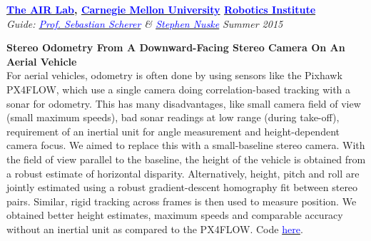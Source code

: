 \documentclass[margin,line]{res}
\newenvironment{list1}{
  \begin{list}{\ding{113}}{%
      \setlength{\itemsep}{0in}
      \setlength{\parsep}{0in} \setlength{\parskip}{0in}
      \setlength{\topsep}{0in} \setlength{\partopsep}{0in} 
      \setlength{\leftmargin}{0.17in}}}{\end{list}}
\begin{document}
\begin{resume}
{\bf  \href{http://theairlab.org/}{\textcolor{blue}{The AIR Lab}}, \href{http://www.cmu.edu/}{\textcolor{blue}{Carnegie Mellon University}} \href{http://ri.cmu.edu/}{\textcolor{blue}{Robotics Institute}}} \\
{\em Guide: \href{http://www.ri.cmu.edu/person.html?person_id=1397}{\textcolor{blue}{Prof. Sebastian Scherer}} \& \href{http://www.ri.cmu.edu/person.html?person_id=2128}{\textcolor{blue} {Stephen Nuske}}} \hfill {\it Summer 2015} \\
\vspace*{-.13in}
\begin{list1}
\item[]\textbf{Stereo Odometry From A Downward-Facing Stereo Camera On An Aerial Vehicle} \\
For aerial vehicles, odometry is often done by using sensors like the Pixhawk PX4FLOW, which use a single camera doing correlation-based tracking with a sonar for odometry. This has many disadvantages, like small camera field of view (small maximum speeds), bad sonar readings at low range (during take-off), requirement of an inertial unit for angle measurement and height-dependent camera focus. We aimed to replace this with a small-baseline stereo camera. With the field of view parallel to the baseline, the height of the vehicle is obtained from a robust estimate of horizontal disparity. Alternatively, height, pitch and roll are jointly estimated using a robust gradient-descent homography fit between stereo pairs. Similar, rigid tracking across frames is then used to measure position. We obtained better height estimates, maximum speeds and comparable accuracy without an inertial unit as compared to the PX4FLOW. Code \href{https://github.com/alankarkotwal/ground_odom}{\textcolor{blue} {here}}.
\end{list1}


\end{resume}
\end{document}
